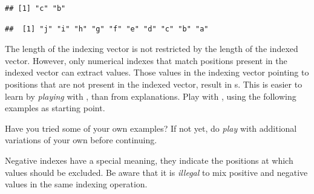 \documentclass[krantz2]{krantz}\usepackage{knitr}%
\begin{document}
\begin{knitrout}\footnotesize
{}\color{fgcolor}\begin{kframe}
\begin{alltt}
\hlstd{a[}\hlstd{(}\hlstd{,}\hlstd{)]}
\end{alltt}
\begin{verbatim}
## [1] "c" "b"
\end{verbatim}
\begin{alltt}
\hlstd{a[}\hlopt{:}\hlstd{]}
\end{alltt}
\begin{verbatim}
##  [1] "j" "i" "h" "g" "f" "e" "d" "c" "b" "a"
\end{verbatim}
\end{kframe}
\end{knitrout}

\begin{playground}
The length of the indexing vector is not restricted by the length of the indexed vector. However, only numerical indexes that match positions present in the indexed vector can extract values. Those values in the indexing vector pointing to positions that are not present in the indexed vector, result in s. This is easier to learn by \emph{playing} with \Rlang, than from explanations. Play with \Rlang, using the following examples as starting point.

\begin{knitrout}\footnotesize
{}\color{fgcolor}\begin{kframe}
\begin{alltt}
\hlstd{a[}\hlstd{(}\hlstd{,}\hlstd{,}\hlstd{,}\hlstd{)]}
\hlstd{a[}\hlstd{(}\hlopt{:}\hlstd{,} \hlopt{:}\hlstd{)]}
\hlstd{a[}\hlstd{(}\hlstd{,}\hlstd{)]}
\hlstd{a[}\hlstd{]}
\end{alltt}
\end{kframe}
\end{knitrout}

Have you tried some of your own examples? If not yet, do \emph{play} with additional variations of your own before continuing.

\end{playground}

Negative indexes have a special meaning, they indicate the positions at which values should be excluded. Be aware that it is \emph{illegal} to mix positive and negative values in the same indexing operation.
\end{document}
